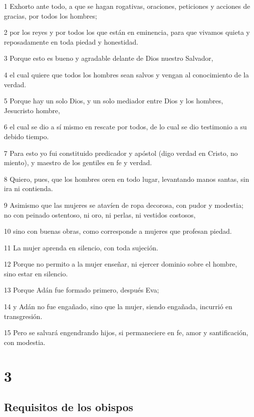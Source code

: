 \par 1 Exhorto ante todo, a que se hagan rogativas, oraciones, peticiones y acciones de gracias, por todos los hombres;
\par 2 por los reyes y por todos los que están en eminencia, para que vivamos quieta y reposadamente en toda piedad y honestidad.
\par 3 Porque esto es bueno y agradable delante de Dios nuestro Salvador,
\par 4 el cual quiere que todos los hombres sean salvos y vengan al conocimiento de la verdad.
\par 5 Porque hay un solo Dios, y un solo mediador entre Dios y los hombres, Jesucristo hombre,
\par 6 el cual se dio a sí mismo en rescate por todos, de lo cual se dio testimonio a su debido tiempo.
\par 7 Para esto yo fui constituido predicador y apóstol (digo verdad en Cristo, no miento), y maestro de los gentiles en fe y verdad.
\par 8 Quiero, pues, que los hombres oren en todo lugar, levantando manos santas, sin ira ni contienda.
\par 9 Asimismo que las mujeres se atavíen de ropa decorosa, con pudor y modestia; no con peinado ostentoso, ni oro, ni perlas, ni vestidos costosos,
\par 10 sino con buenas obras, como corresponde a mujeres que profesan piedad.
\par 11 La mujer aprenda en silencio, con toda sujeción.
\par 12 Porque no permito a la mujer enseñar, ni ejercer dominio sobre el hombre, sino estar en silencio.
\par 13 Porque Adán fue formado primero, después Eva;
\par 14 y Adán no fue engañado, sino que la mujer, siendo engañada, incurrió en transgresión.
\par 15 Pero se salvará engendrando hijos, si permaneciere en fe, amor y santificación, con modestia.

\chapter{3}

\section*{Requisitos de los obispos}


